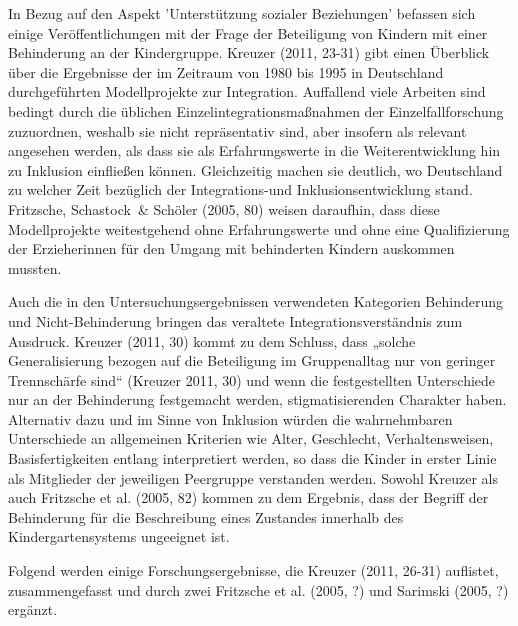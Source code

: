 In Bezug auf den Aspekt 'Unterstützung sozialer Beziehungen' befassen sich einige Veröffentlichungen mit der Frage der Beteiligung von Kindern mit einer Behinderung an der Kindergruppe. Kreuzer (2011, 23-31) gibt einen Überblick über die Ergebnisse der im Zeitraum von 1980 bis 1995 in Deutschland durchgeführten Modellprojekte zur Integration. Auffallend viele Arbeiten sind bedingt durch die üblichen Einzelintegrationsmaßnahmen der Einzelfallforschung zuzuordnen, weshalb sie nicht repräsentativ sind, aber insofern als relevant angesehen werden, als dass sie als Erfahrungswerte in die Weiterentwicklung hin zu Inklusion einfließen können. Gleichzeitig machen sie deutlich, wo Deutschland zu welcher Zeit bezüglich der Integrations-und Inklusionsentwicklung stand. Fritzsche, Schastock~\& Schöler (2005, 80) weisen daraufhin, dass diese Modellprojekte weitestgehend ohne Erfahrungswerte und ohne eine Qualifizierung der Erzieherinnen für den Umgang mit behinderten Kindern auskommen mussten. 

Auch die in den Untersuchungsergebnissen verwendeten Kategorien Behinderung und Nicht-Behinderung bringen das veraltete Integrationsverständnis zum Ausdruck. Kreuzer (2011, 30) kommt zu dem Schluss, dass „solche Generalisierung bezogen auf die Beteiligung im Gruppenalltag nur von geringer Trennschärfe sind“ (Kreuzer 2011, 30) und wenn die festgestellten Unterschiede nur an der Behinderung festgemacht werden, stigmatisierenden Charakter haben. Alternativ dazu und im Sinne von Inklusion würden die wahrnehmbaren Unterschiede an allgemeinen Kriterien wie Alter, Geschlecht, Verhaltensweisen, Basisfertigkeiten entlang interpretiert werden, so dass die Kinder in erster Linie als Mitglieder der jeweiligen Peergruppe verstanden werden. Sowohl Kreuzer als auch Fritzsche et al. (2005, 82) kommen zu dem Ergebnis, dass der Begriff der Behinderung für die Beschreibung eines Zustandes innerhalb des Kindergartensystems ungeeignet ist.  

Folgend werden einige Forschungsergebnisse, die Kreuzer (2011, 26-31) auflistet, zusammengefasst und durch zwei Fritzsche et al. (2005, ?) und Sarimski (2005, ?) ergänzt. 


